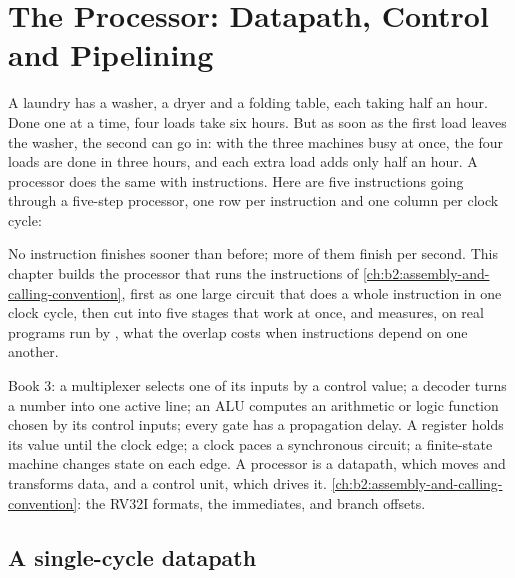 \chapter{The Processor: Datapath, Control and Pipelining}\label{ch:b2:processor-and-pipelining}

A laundry has a washer, a dryer and a folding table, each taking half an hour. Done one at a time, four loads take
six hours. But as soon as the first load leaves the washer, the second can go in: with the three machines busy at
once, the four loads are done in three hours, and each extra load adds only half an hour. A processor does the same
with instructions. Here are five instructions going through a five-step processor, one row per instruction and one
column per clock cycle:

\label{out:b2:processor-and-pipelining:hook}

No instruction finishes sooner than before; more of them finish per second. This chapter builds the processor that
runs the instructions of \cref{ch:b2:assembly-and-calling-convention}, first as one large circuit that does a whole
instruction in one clock cycle, then cut into five stages that work at once, and measures, on real programs run by
, what the overlap costs when instructions depend on one another.

\begin{recall}
Book 3: a multiplexer selects one of its inputs by a control value; a decoder turns a number into one active line;
an ALU computes an arithmetic or logic function chosen by its control inputs; every gate has a propagation delay.
A register holds its value until the clock edge; a clock paces a synchronous circuit; a finite-state machine changes
state on each edge. A processor is a datapath, which moves and transforms data, and a control unit, which drives it.
\cref{ch:b2:assembly-and-calling-convention}: the RV32I formats, the immediates, and branch offsets.
\end{recall}

\section{A single-cycle datapath}\label{sec:b2:processor-and-pipelining:datapath}

